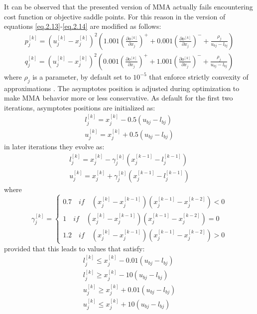 It can be observed that the presented version of MMA actually fails encountering cost function or objective saddle points.
For this reason in the version of \cite{svanberg2007mma} equations \eqref{eq.2.13}-\eqref{eq.2.14} are modified as follows:
\begin{eqnarray}
p_j^{[k]}=\left(u_j^{[k]}-x_j^{[k]}\right)^2\left(1.001\left(\frac{\partial o^{[k]}}{\partial x_j}\right)^++0.001\left(\frac{\partial o^{[k]}}{\partial x_j}\right)^-+\frac{\rho_j}{u_{bj}-l_{bj}}\right)\\
q_j^{[k]}=\left(u_j^{[k]}-x_j^{[k]}\right)^2\left(0.001\left(\frac{\partial o^{[k]}}{\partial x_j}\right)^++1.001\left(\frac{\partial o^{[k]}}{\partial x_j}\right)^-+\frac{\rho_j}{u_{bj}-l_{bj}}\right)
\end{eqnarray}
where $\rho_j$ is a parameter, by default set to $10^{-5}$ that enforce strictly convexity of approximations \cite{svanberg2007mma}. The asymptotes position is adjusted during optimization to make MMA behavior more or less conservative. 
As default for the first two iterations, asymptotes positions are initialized as:
\begin{eqnarray}
l_j^{[k]}=x_j^{[k]}-0.5\left(u_{bj}-l_{bj}\right)\\
u_j^{[k]}=x_j^{[k]}+0.5\left(u_{bj}-l_{bj}\right)
\end{eqnarray}
in later iterations they evolve as:
\begin{eqnarray}
l_j^{[k]}=x_j^{[k]}-\gamma_j^{[k]}\left(x_j^{[k-1]}-l_j^{[k-1]}\right)\\
u_j^{[k]}=x_j^{[k]}+\gamma_j^{[k]}\left(x_j^{[k-1]}-l_j^{[k-1]}\right)
\end{eqnarray}
where
\begin{equation}
\gamma_j^{[k]}=\begin{cases}
0.7 \quad \textit{if} \quad \left(x_j^{[k]}-x_j^{[k-1]}\right)\left(x_j^{[k-1]}-x_j^{[k-2]}\right)<0\\
1 \quad \textit{if} \quad \left(x_j^{[k]}-x_j^{[k-1]}\right)\left(x_j^{[k-1]}-x_j^{[k-2]}\right)=0\\
1.2 \quad \textit{if} \quad \left(x_j^{[k]}-x_j^{[k-1]}\right)\left(x_j^{[k-1]}-x_j^{[k-2]}\right)>0
\end{cases}
\end{equation}
provided that this leads to values that satisfy:
\begin{eqnarray}
l_j^{[k]}\leq x_j^{[k]}-0.01\left(u_{bj}-l_{bj}\right)\\
\label{eqnMNAl}
l_j^{[k]}\geq x_j^{[k]}-10\left(u_{bj}-l_{bj}\right)\\
u_j^{[k]}\geq x_j^{[k]}+0.01\left(u_{bj}-l_{bj}\right)\\
\label{eqnMNAu}
u_j^{[k]}\leq x_j^{[k]}+10\left(u_{bj}-l_{bj}\right)
\end{eqnarray}
